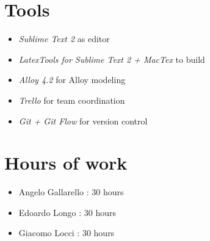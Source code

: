 \newpage
\begin{appendices}
\section{Tools}

\begin{itemize}
	\item \emph{Sublime Text 2} as editor
	\item \emph{LatexTools for Sublime Text 2 + MacTex}  to build
	\item \emph{Alloy 4.2} for Alloy modeling
	\item \emph{Trello} for team coordination 
	\item \emph{Git + Git Flow} for version control 
\end{itemize}

\section{Hours of work}

\begin{itemize}
	\item Angelo Gallarello : 30 hours
	\item Edoardo Longo : 30 hours
	\item Giacomo Locci : 30 hours
\end{itemize}

\end{appendices}